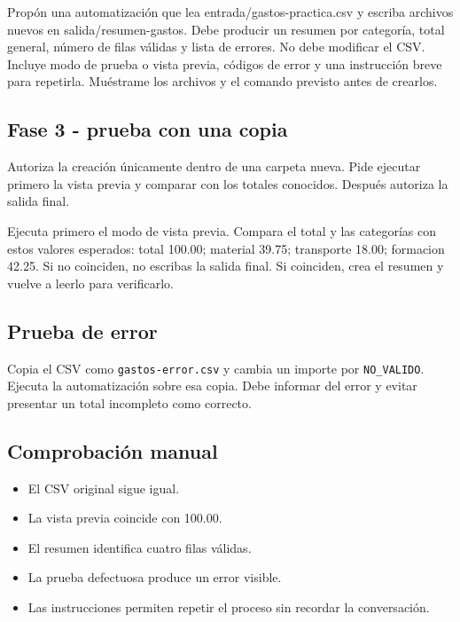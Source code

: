 \documentclass[10pt,a4paper,openany]{book}
\providecommand{\tightlist}{\setlength{\itemsep}{0.18em}\setlength{\parskip}{0pt}}
\newenvironment{Shaded}{}{}
\newcommand{\NormalTok}[1]{#1}
\renewenvironment{Shaded}
  {\begin{tcolorbox}[
    enhanced,
    breakable,
    colback=CodeBg,
    colframe=Border,
    boxrule=0.5pt,
    arc=2mm,
    left=3mm,
    right=3mm,
    top=2.2mm,
    bottom=2.2mm,
    before skip=0.8em,
    after skip=0.9em
  ]}
  {\end{tcolorbox}}
\begin{document}
\begin{Shaded}
\begin{Highlighting}[]
\NormalTok{Propón una automatización que lea entrada/gastos{-}practica.csv y escriba archivos}
\NormalTok{nuevos en salida/resumen{-}gastos. Debe producir un resumen por categoría, total}
\NormalTok{general, número de filas válidas y lista de errores. No debe modificar el CSV.}
\NormalTok{Incluye modo de prueba o vista previa, códigos de error y una instrucción breve}
\NormalTok{para repetirla. Muéstrame los archivos y el comando previsto antes de crearlos.}
\end{Highlighting}
\end{Shaded}

\subsection{Fase 3 - prueba con una
copia}\label{fase-3---prueba-con-una-copia}

Autoriza la creación únicamente dentro de una carpeta nueva. Pide
ejecutar primero la vista previa y comparar con los totales conocidos.
Después autoriza la salida final.

\begin{Shaded}
\begin{Highlighting}[]
\NormalTok{Ejecuta primero el modo de vista previa. Compara el total y las categorías con}
\NormalTok{estos valores esperados: total 100.00; material 39.75; transporte 18.00;}
\NormalTok{formacion 42.25. Si no coinciden, no escribas la salida final. Si coinciden,}
\NormalTok{crea el resumen y vuelve a leerlo para verificarlo.}
\end{Highlighting}
\end{Shaded}

\subsection{Prueba de error}\label{prueba-de-error}

Copia el CSV como \texttt{gastos-error.csv} y cambia un importe por
\texttt{NO\_VALIDO}. Ejecuta la automatización sobre esa copia. Debe
informar del error y evitar presentar un total incompleto como correcto.

\subsection{Comprobación manual}\label{comprobaciuxf3n-manual-6}

\begin{itemize}
\tightlist
\item
  El CSV original sigue igual.
\item
  La vista previa coincide con 100.00.
\item
  El resumen identifica cuatro filas válidas.
\item
  La prueba defectuosa produce un error visible.
\item
  Las instrucciones permiten repetir el proceso sin recordar la
  conversación.
\end{itemize}
\end{document}
